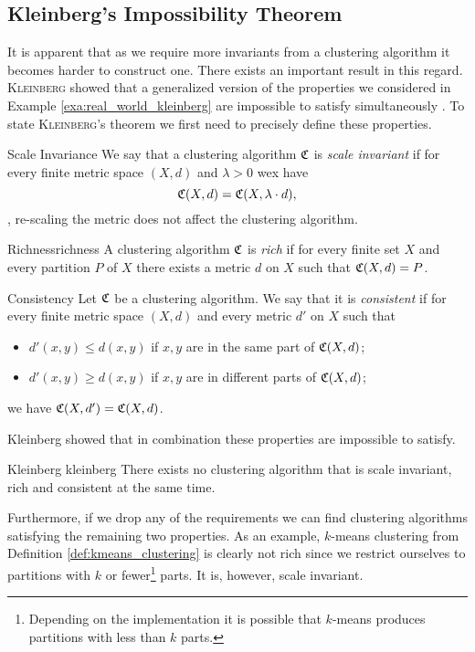 \subsection{Kleinberg's Impossibility Theorem}
It is apparent that as we require more invariants from a clustering algorithm it becomes harder to construct one.
There exists an important result in this regard.
\textsc{Kleinberg} showed that a generalized version of the properties we considered in Example \ref{exa:real_world_kleinberg} are impossible to satisfy simultaneously \cite{Kleinberg2002}.
To state \textsc{Kleinberg}'s theorem we first need to precisely define these properties.

\begin{definition}{Scale Invariance}{}
We say that a clustering algorithm $\mathfrak{C}$ is \emph{scale invariant} if for every finite metric space $(X,d)$ and $\lambda > 0$ wex have
$$
\mathfrak{C}(X,d) = \mathfrak{C}(X, \lambda \cdot d),
$$
\ie, re-scaling the metric does not affect the clustering algorithm.
\end{definition}

\begin{definition}{Richness}{richness}
A clustering algorithm $\mathfrak{C}$ is \emph{rich} if for every finite set $X$ and every partition $P$ of $X$ there exists a metric $d$ on $X$ such that $\mathfrak{C}(X,d) = P$.
\end{definition}

\begin{definition}{Consistency}{}
Let $\mathfrak{C}$ be a clustering algorithm. We say that it is \emph{consistent} if for every finite metric space $(X,d)$ and every metric $d'$ on $X$ such that
\begin{itemize}
    \item $d'(x,y) \leq d(x,y)$ if $x,y$ are in the same part of $\mathfrak{C}(X,d)$;
    \item $d'(x,y) \geq d(x,y)$ if $x,y$ are in different parts of $\mathfrak{C}(X,d)$;
\end{itemize}
we have $\mathfrak{C}(X,d') = \mathfrak{C}(X,d)$.
\end{definition}

Kleinberg showed that in combination these properties are impossible to satisfy.

\begin{theorem}{Kleinberg \cite[Thm.~2.1]{Kleinberg2002}}{kleinberg}
There exists no clustering algorithm that is scale invariant, rich and consistent at the same time.
\end{theorem}

Furthermore, if we drop any of the requirements we can find clustering algorithms satisfying the remaining two properties. As an example, $k$-means clustering from Definition \ref{def:kmeans_clustering} is clearly not rich since we restrict ourselves to partitions with $k$ or fewer\footnote{Depending on the implementation it is possible that $k$-means produces partitions with less than $k$ parts.} parts. It is, however, scale invariant.